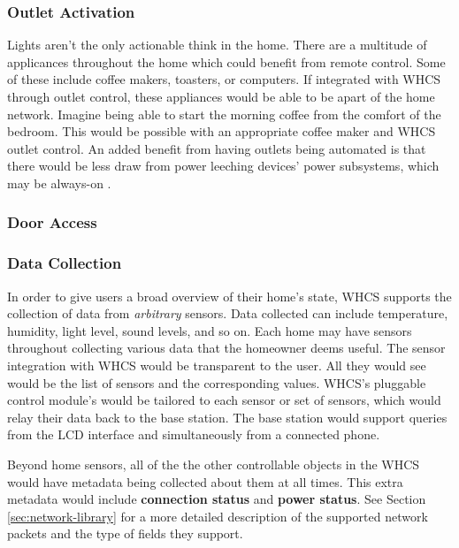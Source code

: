 \subsubsection{Outlet Activation}
Lights aren't the only actionable think in the home. There are a multitude of
applicances throughout the home which could benefit from remote control. Some
of these include coffee makers, toasters, or computers. If integrated with WHCS through outlet control, these appliances
would be able to be apart of the home network. Imagine being able to start the
morning coffee from the comfort of the bedroom. This would be possible with an
appropriate coffee maker and WHCS outlet control. An added benefit from having
outlets being automated is that there would be less draw from power leeching
devices' power subsystems, which may be always-on .

\subsubsection{Door Access}

\subsubsection{Data Collection}
In order to give users a broad overview of their home's state, WHCS supports
the collection of data from \emph{arbitrary} sensors. Data collected can
include temperature, humidity, light level, sound levels, and so on. Each home
may have sensors throughout collecting various data that the homeowner deems
useful. The sensor integration with WHCS would be transparent to the user. All
they would see would be the list of sensors and the corresponding values.
WHCS's pluggable control module's would be tailored to each sensor or set of
sensors, which would relay their data back to the base station. The base
station would support queries from the LCD interface and simultaneously from a
connected phone.

Beyond home sensors, all of the the other controllable objects in the WHCS
would have metadata being collected about them at all times. This extra metadata
would include \textbf{connection status} and \textbf{power status}. See Section
\ref{sec:network-library} for a more detailed description of the supported
network packets and the type of fields they support.


